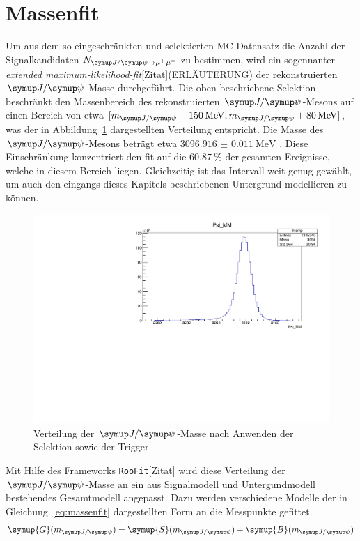 \section{Massenfit}
%
Um aus dem so eingeschränkten und selektierten MC-Datensatz die Anzahl der Signalkandidaten $N_{\kontroll}$ zu bestimmen, wird ein sogennanter \textit{extended maximum-likelihood-fit}[Zitat](ERLÄUTERUNG) der rekonstruierten $\jpsi$-Masse durchgeführt. Die oben beschriebene Selektion beschränkt den Massenbereich des rekonstruierten $\jpsi$-Mesons auf einen Bereich von etwa $[m_{\jpsi}-\SI{150}{\mega\electronvolt}, m_{\jpsi}+\SI{80}{\mega\electronvolt}]$, was der in Abbildung~\ref{fig:mass} dargestellten Verteilung entspricht. Die Masse des $\jpsi$-Mesons beträgt etwa $\SI{3096.916(11)}{\mega\electronvolt}$ \cite{pdg}. Diese Einschränkung konzentriert den fit auf die $\SI{60.87}{\percent}$ der gesamten Ereignisse, welche in diesem Bereich liegen. Gleichzeitig ist das Intervall weit genug gewählt, um auch den eingangs dieses Kapitels beschriebenen Untergrund modellieren zu können.
%
\begin{figure}[H]
  \centering
      \includegraphics[width=\textwidth]{Plots/jpsi_mass.pdf}
  \caption{Verteilung der $\jpsi$-Masse nach Anwenden der Selektion sowie der Trigger.}
  \label{fig:mass}
\end{figure}
%
Mit Hilfe des Frameworks \texttt{RooFit}[Zitat] wird diese Verteilung der $\jpsi$-Masse an ein aus Signalmodell und Untergundmodell bestehendes Gesamtmodell angepasst. Dazu werden verschiedene Modelle der in Gleichung~\ref{eq:massenfit} dargestellten Form an die Messpunkte gefittet.
%
\begin{equation}
  \symup{G}(m_{\jpsi})= \symup{S}(m_{\jpsi}) + \symup{B}(m_{\jpsi})
  \label{eq:massenfit}
\end{equation}
